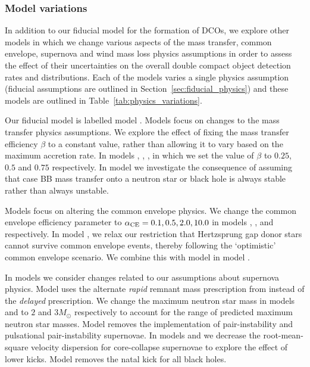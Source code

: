 \subsubsection{Model variations} \label{sec:variation_assumptions}
In addition to our fiducial model for the formation of DCOs, we explore \nMinusOneModels{} other models in which we change various aspects of the mass transfer, common envelope, supernova and wind mass loss physics assumptions in order to assess the effect of their uncertainties on the overall double compact object detection rates and distributions. Each of the models varies a single physics assumption (fiducial assumptions are outlined in Section~\ref{sec:fiducial_physics}) and these models are outlined in Table~\ref{tab:physics_variations}.

Our fiducial model is labelled model \modFid{}. Models \modRangeMT{} focus on changes to the mass transfer physics assumptions. We explore the effect of fixing the mass transfer efficiency $\beta$ to a constant value, rather than allowing it to vary based on the maximum accretion rate. In models \modBetaLow{}, \modBetaMed{}, \modBetaHigh{}, in which we set the value of $\beta$ to $0.25$, $0.5$ and $0.75$ respectively. In model \modCaseBB{} we investigate the consequence of assuming that case BB mass transfer onto a neutron star or black hole is always stable rather than always unstable.

Models \modRangeCE{} focus on altering the common envelope physics. We change the common envelope efficiency parameter to $\alpha_{\rm CE} = 0.1, 0.5, 2.0, 10.0$ in models \modAlphaLowest{}, \modAlphaLow{}, \modAlphaHigh{} and \modAlphaHighest{} respectively. In model \modOpt{}, we relax our restriction that Hertzsprung gap donor stars cannot survive common envelope events, thereby following the `optimistic' common envelope scenario. We combine this with model \modCaseBB{} in model \modCaseBBOpt{}.

In models \modRangeSN{} we consider changes related to our assumptions about supernova physics. Model \modRapid{} uses the alternate \textit{rapid} remnant mass prescription from \citet{Fryer+2012} instead of the \textit{delayed} prescription. We change the maximum neutron star mass in models \modNSLow{} and \modNSHigh{} to $2$ and $3 \unit{M_{\odot}}$ respectively to account for the range of predicted maximum neutron star masses. Model \modNoPISN{} removes the implementation of pair-instability and pulsational pair-instability supernovae. In models \modSigLow{} and \modSigLower{} we decrease the root-mean-square velocity dispersion for core-collapse supernovae to explore the effect of lower kicks. Model \modNoBH{} removes the natal kick for all black holes.


